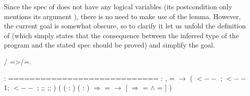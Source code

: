 Since the spec of  does not have any logical variables (its
postcondition only mentions its argument ), there is no need to
make use of the  lemma. However, the current goal is somewhat
obscure, so to clarify it let us unfold the definition of 
(which simply states that the consequence between the inferred type of
the program and the stated spec should be proved) and simplify the goal.
\begin{coqdoccode}
\coqdocemptyline
\coqdocnoindent
{} / =>/=.\coqdoceol
\coqdocemptyline
\end{coqdoccode}


\coqdoceol
\coqdocemptyline
\coqdocindent{1.00em}
 : \coqdoceol
\coqdocindent{1.00em}
============================\coqdoceol
\coqdocindent{1.50em}
\coqdockw{\ensuremath{\forall}}  : ,\coqdoceol
\coqdocindent{1.50em}
 =  \ensuremath{\rightarrow}\coqdoceol
\coqdocindent{1.50em}
 \coqdoceol
\coqdocindent{2.50em}
( $\mathtt{<--}$  ;\coqdoceol
\coqdocindent{3.00em}
 $\mathtt{<--}$  1;\coqdoceol
\coqdocindent{3.00em}
 $\mathtt{<--}$    ;  ;;  ;;  )\coqdoceol
\coqdocindent{2.50em}
( ( :  ) ( : ) \ensuremath{\Rightarrow}\coqdoceol
\coqdocindent{3.00em}
 =  \ensuremath{\rightarrow} [   \ensuremath{\Rightarrow}  =   \ensuremath{\land}  = ]  )

